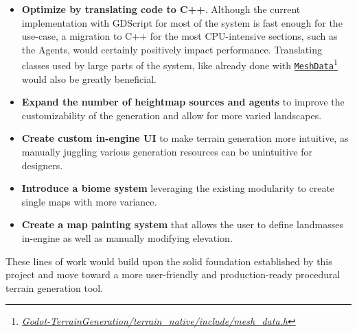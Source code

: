\begin{itemize}
    \item \textbf{Optimize by translating code to C++}. Although the current implementation with GDScript for most of the system is fast enough for the use-case, a migration to C++ for the most CPU-intensive sections, such as the Agents, would certainly positively impact performance. Translating classes used by large parts of the system, like already done with \href{{https://github.com/fsande/TFG---Eric-Rios/blob/main/Godot-TerrainGeneration/terrain_native/include/mesh_data.h}}{\texttt{MeshData}}\footnote{\href{{https://github.com/fsande/TFG---Eric-Rios/blob/main/Godot-TerrainGeneration/terrain_native/include/mesh_data.h}}{\textit{Godot-TerrainGeneration/terrain\_native/include/mesh\_data.h}}} would also be greatly beneficial.

    \item \textbf{Expand the number of heightmap sources and agents} to improve the customizability of the generation and allow for more varied landscapes.

    \item \textbf{Create custom in-engine UI} to make terrain generation more intuitive, as manually juggling various generation resources can be unintuitive for designers.
    
    \item \textbf{Introduce a biome system} leveraging the existing modularity to create single maps with more variance.

    \item \textbf{Create a map painting system} that allows the user to define landmasses in-engine as well as manually modifying elevation.
\end{itemize}

These lines of work would build upon the solid foundation established by this project and move toward a more user-friendly and production-ready procedural terrain generation tool.